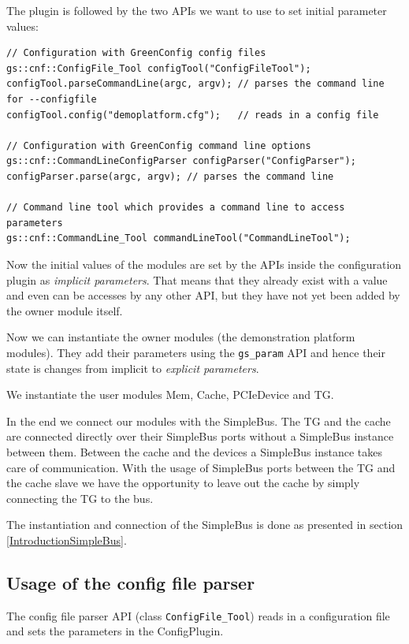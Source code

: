 The plugin is followed by the two APIs we want to use to set initial parameter values:
\begin{lstlisting}
// Configuration with GreenConfig config files
gs::cnf::ConfigFile_Tool configTool("ConfigFileTool");
configTool.parseCommandLine(argc, argv); // parses the command line for --configfile
configTool.config("demoplatform.cfg");   // reads in a config file

// Configuration with GreenConfig command line options
gs::cnf::CommandLineConfigParser configParser("ConfigParser");
configParser.parse(argc, argv); // parses the command line

// Command line tool which provides a command line to access parameters
gs::cnf::CommandLine_Tool commandLineTool("CommandLineTool");
\end{lstlisting}

Now the initial values of the modules are set by the APIs inside the configuration plugin as \emph{implicit parameters}. That means that they already exist with a value and even can be accesses by any other API, but they have not yet been added by the owner module itself. 

Now we can instantiate the owner modules (the demonstration platform modules). They add their parameters using the \lstinline|gs_param| API and hence their state is changes from implicit to \emph{explicit parameters}.

We instantiate the user modules Mem, Cache, PCIeDevice and TG.

In the end we connect our modules with the SimpleBus. The TG and the cache are connected directly over their SimpleBus ports without a SimpleBus instance between them. Between the cache and the devices a SimpleBus instance takes care of communication. With the usage of SimpleBus ports between the TG and the cache slave we have the opportunity to leave out the cache by simply connecting the TG to the bus.

The instantiation and connection of the SimpleBus is done as presented in section \ref{IntroductionSimpleBus}.

\subsection{Usage of the config file parser}
\label{ConfigFileTool}

The config file parser API (class \lstinline|ConfigFile_Tool|) reads in a configuration file and sets the parameters in the ConfigPlugin.

